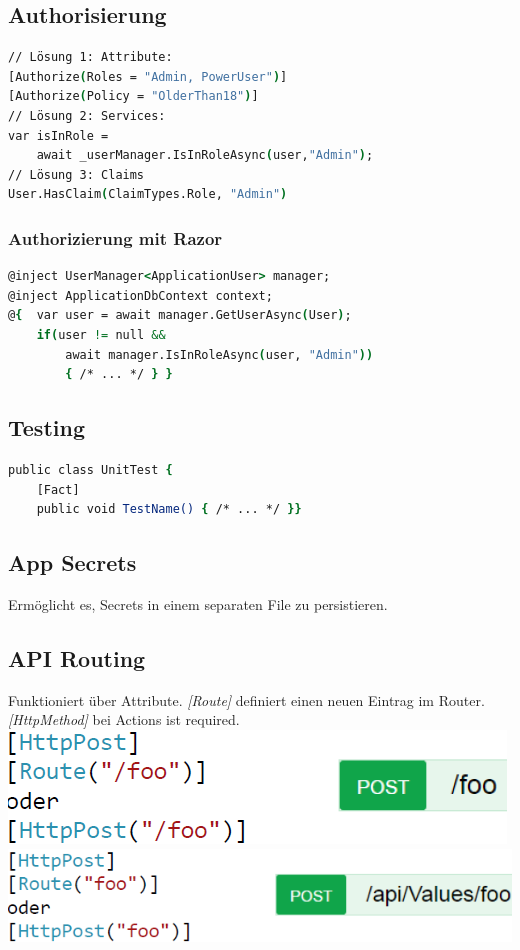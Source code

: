 \subsection{Authorisierung}
\begin{lstlisting}[language=csh]
// Lösung 1: Attribute:
[Authorize(Roles = "Admin, PowerUser")]
[Authorize(Policy = "OlderThan18")]
// Lösung 2: Services:
var isInRole =
    await _userManager.IsInRoleAsync(user,"Admin");
// Lösung 3: Claims
User.HasClaim(ClaimTypes.Role, "Admin")
\end{lstlisting}

\subsubsection{Authorizierung mit Razor}
\begin{lstlisting}[language=csh]
@inject UserManager<ApplicationUser> manager;
@inject ApplicationDbContext context;
@{  var user = await manager.GetUserAsync(User);
    if(user != null &&
        await manager.IsInRoleAsync(user, "Admin"))
        { /* ... */ } }
\end{lstlisting}

\subsection{Testing}
\begin{lstlisting}[language=csh]
public class UnitTest {
    [Fact]
    public void TestName() { /* ... */ }}
\end{lstlisting}

\subsection{App Secrets}
Ermöglicht es, Secrets in einem separaten File zu persistieren.

\subsection{API Routing}
Funktioniert über Attribute. \textit{[Route]} definiert einen neuen Eintrag im Router.
\textit{[HttpMethod]} bei Actions ist required.\\
\includegraphics[width=0.45\linewidth]{img/asp_api_routing.png}
\includegraphics[width=0.55\linewidth]{img/asp_api_routing2.png}
